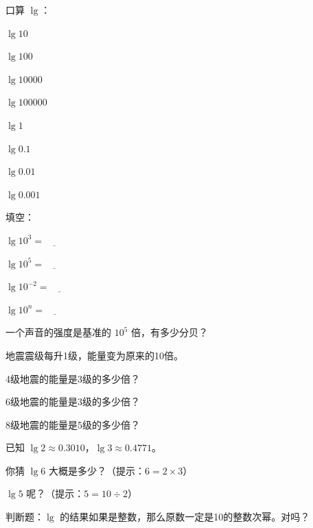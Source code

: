 \begin{exercise}
\item 口算 $\lg$：
  \begin{subexercise}
    \item $\lg 10$
    \item $\lg 100$
    \item $\lg 10000$
    \item $\lg 100000$
    \item $\lg 1$
    \item $\lg 0.1$
    \item $\lg 0.01$
    \item $\lg 0.001$
  \end{subexercise}

\item 填空：
  \begin{subexercise}
    \item $\lg 10^3 = \underline{\qquad}$
    \item $\lg 10^5 = \underline{\qquad}$
    \item $\lg 10^{-2} = \underline{\qquad}$
    \item $\lg 10^n = \underline{\qquad}$
  \end{subexercise}

\item 一个声音的强度是基准的 $10^5$ 倍，有多少分贝？

\item 地震震级每升1级，能量变为原来的10倍。
  \begin{subexercise}
    \item 4级地震的能量是3级的多少倍？
    \item 6级地震的能量是3级的多少倍？
    \item 8级地震的能量是5级的多少倍？
  \end{subexercise}

\item 已知 $\lg 2 \approx 0.3010$，$\lg 3 \approx 0.4771$。
  \begin{subexercise}
    \item 你猜 $\lg 6$ 大概是多少？（提示：$6=2\times3$）
    \item $\lg 5$ 呢？（提示：$5=10\div2$）
  \end{subexercise}

\item 判断题：$\lg$ 的结果如果是整数，那么原数一定是10的整数次幂。对吗？
\end{exercise}


